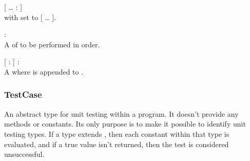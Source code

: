 \begin{dlist}
  \item {}[ \ldots {} :  ]\\
   with  set to [ \ldots {} ].
  
  \item {} : \\
  A  of  to be performed in order.
  
  \item {}[  :  ] : \\
  A  where  is appended to .
\end{dlist}

\subsubsection{TestCase}
An abstract type for unit testing within a \productname{} program. It doesn't
provide any methods or constants. Its only purpose is to make it possible to
identify unit testing types. If a type extends , then each
constant within that type is evaluated, and if a  true value
isn't returned, then the test is considered unsuccessful.
